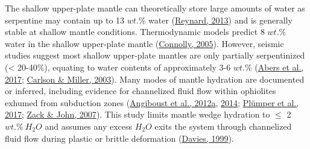 The shallow upper-plate mantle can theoretically store large amounts of water as serpentine may contain up to 13 \(wt.\%\) water (\protect\hyperlink{ref-reynard2013}{Reynard, 2013}) and is generally stable at shallow mantle conditions. Thermodynamic models predict 8 \(wt.\%\) water in the shallow upper-plate mantle (\protect\hyperlink{ref-connolly2005}{Connolly, 2005}). However, seismic studies suggest most shallow upper-plate mantles are only partially serpentinized (\textless{} 20-40\%), equating to water contents of approximately 3-6 \(wt.\%\) (\protect\hyperlink{ref-abers2017}{Abers et al., 2017}; \protect\hyperlink{ref-carlson2003}{Carlson \& Miller, 2003}). Many modes of mantle hydration are documented or inferred, including evidence for channelized fluid flow within ophiolites exhumed from subduction zones (\protect\hyperlink{ref-angiboust2012a}{Angiboust et al., 2012a}, \protect\hyperlink{ref-angiboust2014}{2014}; \protect\hyperlink{ref-plumper2017}{Plümper et al., 2017}; \protect\hyperlink{ref-zack2007}{Zack \& John, 2007}). This study limits mantle wedge hydration to \(\leq\) 2 \(wt.\%~H_{2}O\) and assumes any excess \(H_{2}O\) exits the system through channelized fluid flow during plastic or brittle deformation (\protect\hyperlink{ref-davies1999}{Davies, 1999}).

